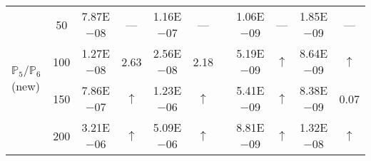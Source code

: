 \begin{table}[H]
{\begin{tabular}{@{}l c c c c c c c c c c@{}}
\midrule
\multirow{4}{*}{$\mathbb{P}_{5}/\mathbb{P}_{6}$ (new)}
 & 50 & 7.87E$-$08 & ---  & 1.16E$-$07 & --- &  & 1.06E$-$09 & --- & 1.85E$-$09 & ---\\
 & 100 & 1.27E$-$08 & 2.63  & 2.56E$-$08 & 2.18 &  & 5.19E$-$09 & $\uparrow$ & 8.64E$-$09 & $\uparrow$\\
 & 150 & 7.86E$-$07 & $\uparrow$  & 1.23E$-$06 & $\uparrow$ &  & 5.41E$-$09 & $\uparrow$ & 8.38E$-$09 & 0.07\\
 & 200 & 3.21E$-$06 & $\uparrow$  & 5.09E$-$06 & $\uparrow$ &  & 8.81E$-$09 & $\uparrow$ & 1.32E$-$08 & $\uparrow$\\
\bottomrule
\end{tabular}}
\label{none}
\end{table}
